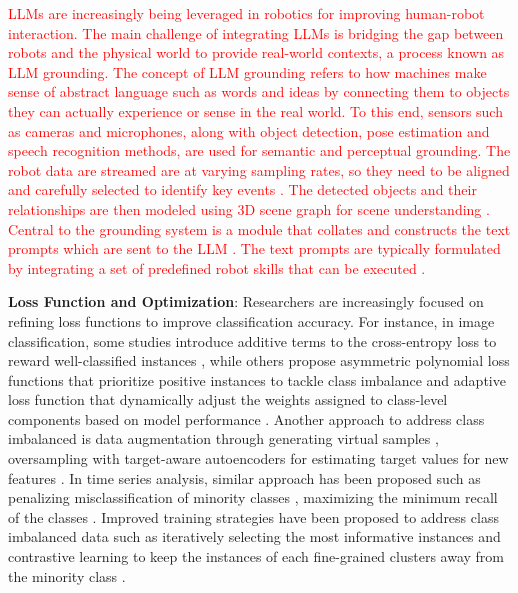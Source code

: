 \documentclass[preprint,12pt]{elsarticle}
\begin{document}
\textcolor{red}{LLMs are increasingly being leveraged in robotics for improving human-robot interaction. The main challenge of integrating LLMs is bridging the gap between robots and the physical world to provide real-world contexts, a process known as LLM grounding. The concept of LLM grounding refers to how machines make sense of abstract language such as words and ideas by connecting them to objects they can actually experience or sense in the real world. To this end, sensors such as cameras and microphones, along with object detection, pose estimation and speech recognition methods, are used for semantic and perceptual grounding. The robot data are streamed are at varying sampling rates, so they need to be aligned and carefully selected to identify key events \citep{wang_i_2024}. The detected objects and their relationships are then modeled using 3D scene graph for scene understanding \citep{chen_synergai_2024}. Central to the grounding system is a module that collates and constructs the text prompts which are sent to the LLM \citep{allgeuer_when_2024}. The text prompts are typically formulated by integrating a set of predefined robot skills that can be executed \citep{asuzu_humanrobot_2025}.}

\textbf{Loss Function and Optimization}: Researchers are increasingly focused on refining loss functions to improve classification accuracy. For instance, in image classification, some studies introduce additive terms to the cross-entropy loss to reward well-classified instances \citep{zhao_well-classified_2022}, while others propose asymmetric polynomial loss functions that prioritize positive instances to tackle class imbalance \citep{huang_asymmetric_2023} and adaptive loss function that dynamically adjust the weights assigned to class-level components based on model performance \citep{maldonado2023owadapt}. Another approach to address class imbalanced is data augmentation through generating virtual samples \citep{zhu2024irda}, oversampling with target-aware autoencoders for estimating target values for new features \citep{belhaouari2024oversampling}. In time series analysis, similar approach has been proposed such as penalizing misclassification of minority classes \citep{wang2024class}, maximizing the minimum recall of the classes \citep{ircio2023minimum}. Improved training strategies have been proposed to address class imbalanced data such as iteratively selecting the most informative instances \citep{moles2024exploring} and contrastive learning to keep the instances of each fine-grained clusters away from the minority class \citep{zhu2024sfpl}.
\end{document}
